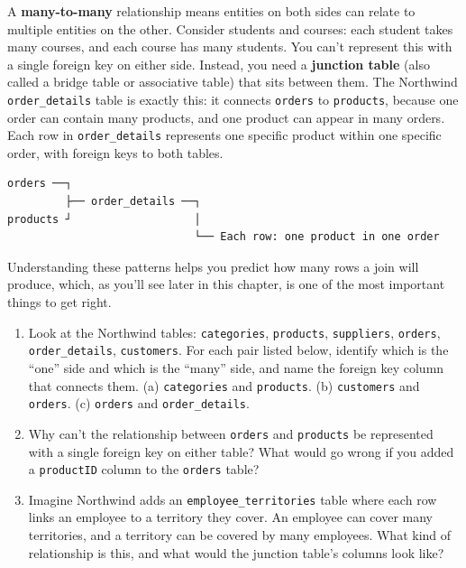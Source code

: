 \documentclass[
  letterpaper,
  DIV=11,
  numbers=noendperiod]{scrreprt}
\begin{document}
A \textbf{many-to-many} relationship means entities on both sides can
relate to multiple entities on the other. Consider students and courses:
each student takes many courses, and each course has many students. You
can't represent this with a single foreign key on either side. Instead,
you need a \textbf{junction table} (also called a bridge table or
associative table) that sits between them. The Northwind
\texttt{order\_details} table is exactly this: it connects
\texttt{orders} to \texttt{products}, because one order can contain many
products, and one product can appear in many orders. Each row in
\texttt{order\_details} represents one specific product within one
specific order, with foreign keys to both tables.

\begin{verbatim}
orders ──┐
         ├── order_details ──┐
products ┘                   │
                             └── Each row: one product in one order
\end{verbatim}

Understanding these patterns helps you predict how many rows a join will
produce, which, as you'll see later in this chapter, is one of the most
important things to get right.

\begin{tcolorbox}[enhanced jigsaw, opacitybacktitle=0.6, arc=.35mm, colback=white, bottomtitle=1mm, opacityback=0, toprule=.15mm, left=2mm, colbacktitle=quarto-callout-note-color!10!white, breakable, coltitle=black, toptitle=1mm, colframe=quarto-callout-note-color-frame, bottomrule=.15mm, titlerule=0mm, title=\textcolor{quarto-callout-note-color}{\faInfo}\hspace{0.5em}{Exercises}, rightrule=.15mm, leftrule=.75mm]

\begin{enumerate}
\def\labelenumi{\arabic{enumi}.}
\item
  Look at the Northwind tables: \texttt{categories}, \texttt{products},
  \texttt{suppliers}, \texttt{orders}, \texttt{order\_details},
  \texttt{customers}. For each pair listed below, identify which is the
  ``one'' side and which is the ``many'' side, and name the foreign key
  column that connects them. (a) \texttt{categories} and
  \texttt{products}. (b) \texttt{customers} and \texttt{orders}. (c)
  \texttt{orders} and \texttt{order\_details}.
\item
  Why can't the relationship between \texttt{orders} and
  \texttt{products} be represented with a single foreign key on either
  table? What would go wrong if you added a \texttt{productID} column to
  the \texttt{orders} table?
\item
  Imagine Northwind adds an \texttt{employee\_territories} table where
  each row links an employee to a territory they cover. An employee can
  cover many territories, and a territory can be covered by many
  employees. What kind of relationship is this, and what would the
  junction table's columns look like?
\end{enumerate}

\end{tcolorbox}
\end{document}
